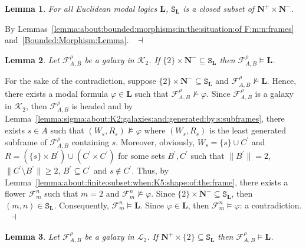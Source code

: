 \documentclass[draft]{article}
\newtheorem{lemma}{Lemma}
\newenvironment{proof}{{\bf Proof:}}{~$\dashv$\\}
\def\L{\mathbf{L}}
\begin{document}
%
%
\begin{lemma}\label{lemma:S:L:is:closed:subset:of:N:plus:times:N:minus}
%
%
For all Euclidean modal logics $\L$, $\mathtt{S}_{\L}$ is a closed subset of $\mathbf{N}^{+}{\times}\mathbf{N}^{-}$.
%
%
\end{lemma}
%
%
\begin{proof}
%
%
By Lemmas~\ref{lemma:about:bounded:morphisms:in:the:situation:of F:m:n:frames} and~\ref{Bounded:Morphism:Lemma}.
%
%
\medskip
%
%
\end{proof}
%
%
\begin{lemma}\label{lemma:alpha}
%
%
Let ${\mathcal F}^{\rho}_{A,B}$ be a galaxy in ${\mathcal K}_{2}$.
If $\{2\}{\times}\mathbf{N}^{-}{\subseteq}\mathtt{S}_{\L}$ then ${\mathcal F}^{\rho}_{A,B}{\models}\L$.
%
%
\end{lemma}
%
%
\begin{proof}
%
%
For the sake of the contradiction, suppose $\{2\}{\times}\mathbf{N}^{-}{\subseteq}\mathtt{S}_{\L}$ and ${\mathcal F}^{\rho}_{A,B}{\not\models}\L$.
Hence, there exists a modal formula $\varphi{\in}\L$ such that ${\mathcal F}^{\rho}_{A,B}{\not\models}\varphi$.
Since ${\mathcal F}^{\rho}_{A,B}$ is a galaxy in ${\mathcal K}_{2}$, then ${\mathcal F}^{\rho}_{A,B}$ is headed and by Lemma~\ref{lemma:sigma:about:K2:galaxies:and:generated:by:s:subframes}, there exists $s{\in}A$ such that $(W_{s},R_{s}){\not\models}\varphi$ where $(W_{s},R_{s})$ is the least generated subframe of ${\mathcal F}_{A,B}^{\rho}$ containing $s$.
Moreover, obviously, $W_{s}{=}\{s\}{\cup}C^{\prime}$ and $R{=}(\{s\}{\times}B^{\prime}){\cup}(C^{\prime}{\times}C^{\prime})$ for some sets $B^{\prime},C^{\prime}$ such that ${\parallel}B^{\prime}{\parallel}{=}2$, ${\parallel}C^{\prime}{\setminus}B^{\prime}{\parallel}{\geq}2$, $B^{\prime}{\subseteq}C^{\prime}$ and $s{\not\in}C^{\prime}$.
Thus, by Lemma~\ref{lemma:about:finite:subset:when:K5:shape:of:the:frame}, there exists a flower ${\mathcal F}_{m}^{n}$ such that $m{=}2$ and ${\mathcal F}_{m}^{n}{\not\models}\varphi$.
Since $\{2\}{\times}\mathbf{N}^{-}{\subseteq}\mathtt{S}_{\L}$, then $(m,n){\in}\mathtt{S}_{\L}$.
Consequently, ${\mathcal F}_{m}^{n}{\models}\L$.
Since $\varphi{\in}\L$, then ${\mathcal F}_{m}^{n}{\models}\varphi$: a contradiction.
%
%
\medskip
%
%
\end{proof}
%
%
\begin{lemma}\label{lemma:beta}
%
%
Let ${\mathcal F}^{\rho}_{A,B}$ be a galaxy in ${\mathcal L}_{2}$.
If $\mathbf{N}^{+}{\times}\{2\}{\subseteq}\mathtt{S}_{\L}$ then ${\mathcal F}^{\rho}_{A,B}{\models}\L$.
%
%
\end{lemma}
\end{document}
